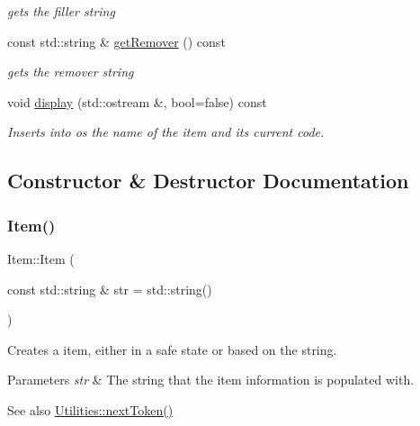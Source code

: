 \begin{DoxyCompactItemize}
\begin{DoxyCompactList}\small\item\em gets the filler string \end{DoxyCompactList}\item 
const std\+::string \& \mbox{\hyperlink{class_item_a259c9f359ed2378aae4cbb5ea53bef18}{get\+Remover}} () const
\begin{DoxyCompactList}\small\item\em gets the remover string \end{DoxyCompactList}\item 
void \mbox{\hyperlink{class_item_a9433e55e0165564bbbdb77bd01853728}{display}} (std\+::ostream \&, bool=false) const
\begin{DoxyCompactList}\small\item\em Inserts into os the name of the item and its current code. \end{DoxyCompactList}\end{DoxyCompactItemize}


\subsection{Constructor \& Destructor Documentation}
\mbox{\label{class_item_a878f8ff05023bb47d42bf2c2a98da323}} 
\subsubsection{\texorpdfstring{Item()}{Item()}}
{\footnotesize\ttfamily Item\+::\+Item (\begin{DoxyParamCaption}\item[{const std\+::string \&}]{str = {\ttfamily std\+:\+:string()} }\end{DoxyParamCaption})}



Creates a item, either in a safe state or based on the string. 


\begin{DoxyParams}{Parameters}
{\em str} & The string that the item information is populated with. \\
\hline
\end{DoxyParams}
\begin{DoxySeeAlso}{See also}
\mbox{\hyperlink{class_utilities_a59c27deae1e3810d8591b35ed90b7f33}{Utilities\+::next\+Token()}} 
\end{DoxySeeAlso}


